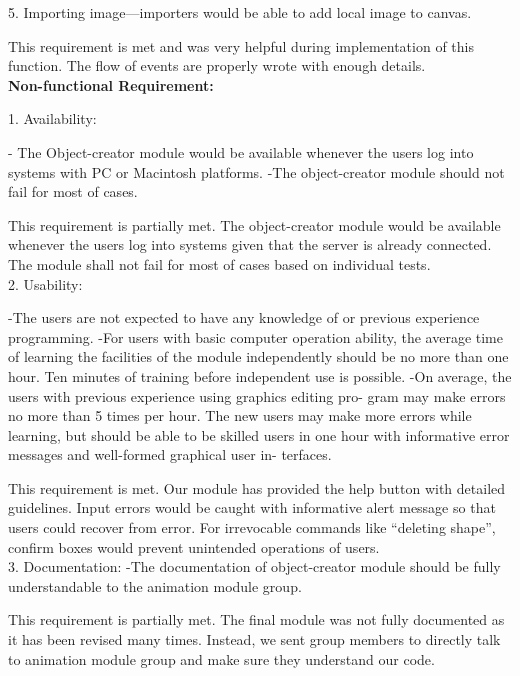 \documentclass[a4paper, 11pt]{article} %
\begin{document}
5.	Importing image—importers would be able to add local image to canvas.

This requirement is met and was very helpful during implementation of this function. The flow of events are properly wrote with enough details.
\\

\textbf {Non-functional Requirement:} 

1. 	Availability:

- The Object-creator module would be available whenever the users log into systems with PC or Macintosh platforms.
-The object-creator module should not fail for most of cases.

This requirement is partially met. The object-creator module would be available whenever the users log into systems given that the server is already connected. The module shall not fail for most of cases based on individual tests.\\

2.	Usability:

-The users are not expected to have any knowledge of or previous experience programming.
-For users with basic computer operation ability, the average time of learning the facilities of the module independently should be no more than one hour.
Ten minutes of training before independent use is possible.
-On average, the users with previous experience using graphics editing pro-
gram may make errors no more than 5 times per hour. The new users may
make more errors while learning, but should be able to be skilled users in
one hour with informative error messages and well-formed graphical user in-
terfaces.

This requirement is met. Our module has provided the help button with detailed guidelines. Input errors would be caught with informative alert message so that users could recover from error. For irrevocable commands like “deleting shape”, confirm boxes would prevent unintended operations of users.\\

3. 	Documentation:
-The documentation of object-creator module should be fully understandable to the animation module group.

This requirement is partially met. The final module was not fully documented as it has been revised many times. Instead, we sent group members to directly talk to animation module group and make sure they understand our code.\\
\end{document}
